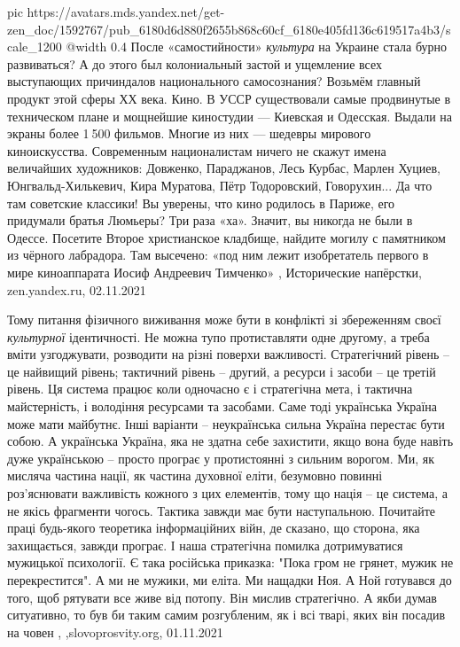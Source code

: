 \ifcmt
  pic https://avatars.mds.yandex.net/get-zen_doc/1592767/pub_6180d6d880f2655b868c60cf_6180e405fd136c619517a4b3/scale_1200
  @width 0.4
\fi
После «самостийности» \emph{культура} на Украине стала бурно развиваться? А до
этого был колониальный застой и ущемление всех выступающих причиндалов
национального самосознания? Возьмём главный продукт этой сферы ХХ века. Кино. В
УССР существовали самые продвинутые в техническом плане и мощнейшие киностудии
— Киевская и Одесская. Выдали на экраны более 1 500 фильмов.  Многие из них —
шедевры мирового киноискусства. Современным националистам ничего не скажут
имена величайших художников: Довженко, Параджанов, Лесь Курбас, Марлен Хуциев,
Юнгвальд-Хилькевич, Кира Муратова, Пётр Тодоровский, Говорухин... Да что там
советские классики! Вы уверены, что кино родилось в Париже, его придумали
братья Люмьеры?  Три раза «ха». Значит, вы никогда не были в Одессе. Посетите
Второе христианское кладбище, найдите могилу с памятником из чёрного лабрадора.
Там высечено: «под ним лежит изобретатель первого в мире киноаппарата Иосиф
Андреевич Тимченко»
, 
Исторические напёрстки, zen.yandex.ru, 02.11.2021

Тому питання фізичного виживання може бути в конфлікті зі збереженням своєї
\emph{культурної} ідентичності. Не можна тупо протиставляти одне другому, а треба
вміти узгоджувати, розводити на різні поверхи важливості. Стратегічний рівень –
це найвищий рівень; тактичний рівень – другий, а ресурси і засоби – це третій
рівень. Ця система працює коли одночасно є і стратегічна мета, і тактична
майстерність, і володіння ресурсами та засобами. Саме тоді українська Україна
може мати майбутнє.  Інші варіанти – неукраїнська сильна Україна перестає бути
собою. А українська Україна, яка не здатна себе захистити, якщо вона буде
навіть дуже українською – просто програє у протистоянні з сильним ворогом.  Ми,
як мисляча частина нації, як частина духовної еліти, безумовно повинні
роз’яснювати важливість кожного з цих елементів, тому що нація – це система, а
не якісь фрагменти чогось.  Тактика завжди має бути наступальною. Почитайте
праці будь-якого теоретика інформаційних війн, де сказано, що сторона, яка
захищається, завжди програє. І наша стратегічна помилка дотримуватися мужицької
психології. Є така російська приказка: "Пока гром не грянет, мужик не
перекрестится". А ми не мужики, ми еліта. Ми нащадки Ноя. А Ной готувався до
того, щоб рятувати все живе від потопу. Він мислив стратегічно. А якби думав
ситуативно, то був би таким самим розгубленим, як і всі тварі, яких він посадив
на човен
, ,slovoprosvity.org, 01.11.2021
